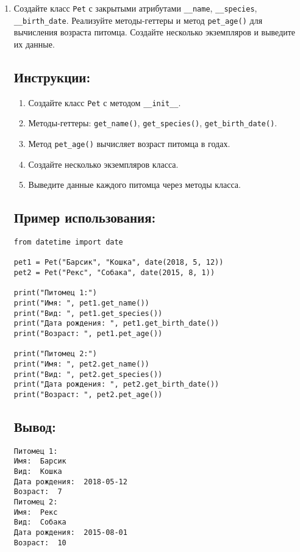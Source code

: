 \begin{enumerate}
\item
Создайте класс \texttt{Pet} с закрытыми атрибутами \texttt{\_\_name}, \texttt{\_\_species}, \texttt{\_\_birth\_date}. Реализуйте методы-геттеры и метод \texttt{pet\_age()} для вычисления возраста питомца. Создайте несколько экземпляров и выведите их данные.

\subsection*{Инструкции:}
\begin{enumerate}
    \item Создайте класс \texttt{Pet} с методом \texttt{\_\_init\_\_}.
    \item Методы-геттеры: \texttt{get\_name()}, \texttt{get\_species()}, \texttt{get\_birth\_date()}.
    \item Метод \texttt{pet\_age()} вычисляет возраст питомца в годах.
    \item Создайте несколько экземпляров класса.
    \item Выведите данные каждого питомца через методы класса.
\end{enumerate}

\subsection*{Пример использования:}
\begin{lstlisting}[caption=Пример кода]
from datetime import date

pet1 = Pet("Барсик", "Кошка", date(2018, 5, 12))
pet2 = Pet("Рекс", "Собака", date(2015, 8, 1))

print("Питомец 1:")
print("Имя: ", pet1.get_name())
print("Вид: ", pet1.get_species())
print("Дата рождения: ", pet1.get_birth_date())
print("Возраст: ", pet1.pet_age())

print("Питомец 2:")
print("Имя: ", pet2.get_name())
print("Вид: ", pet2.get_species())
print("Дата рождения: ", pet2.get_birth_date())
print("Возраст: ", pet2.pet_age())
\end{lstlisting}

\subsection*{Вывод:}
\begin{lstlisting}[caption=Ожидаемый вывод]
Питомец 1:
Имя:  Барсик
Вид:  Кошка
Дата рождения:  2018-05-12
Возраст:  7
Питомец 2:
Имя:  Рекс
Вид:  Собака
Дата рождения:  2015-08-01
Возраст:  10
\end{lstlisting}


\end{enumerate}
